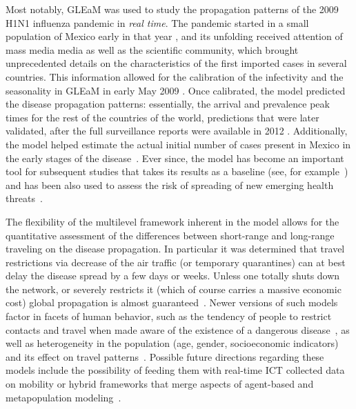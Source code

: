 Most notably, GLEaM was used to study the propagation patterns of the 2009 H1N1 influenza pandemic in \emph{real time}. The pandemic started in a small population of Mexico early in that year \cite{fraser_2009_pandemic}, and its unfolding received attention of mass media media as well as the scientific community, which brought unprecedented details on the characteristics of the first imported cases in several countries. This information allowed for the calibration of the infectivity and the seasonality in GLEaM in early May 2009 \cite{balcan_2009_seasonal}. Once calibrated, the model predicted the disease propagation patterns: essentially, the arrival and prevalence peak times for the rest of the countries of the world, predictions that were later validated, after the full surveillance reports were available in 2012 \cite{tizzoni_2012_real}. Additionally, the model helped estimate the actual initial number of cases present in Mexico in the early stages of the disease~\cite{colizza_2009_estimate}. Ever since, the model has become an important tool for subsequent studies that takes its results as a baseline (see, for example~\cite{brockmann_2013_hidden,lawyer_2016_measuring}) and has been also used to assess the risk of spreading of new emerging health threats~\cite{goncalves_2013_human,gomes_2014_assessing,poletto_2014_assessing}.

The flexibility of the multilevel framework inherent in the model allows for the quantitative assessment of the differences between short-range and long-range traveling on the disease propagation. In particular it was determined that travel restrictions via decrease of the air traffic (or temporary quarantines) can at best delay the disease spread by a few days or weeks. Unless one totally shuts down the network, or severely restricts it (which of course carries a massive economic cost) global propagation is almost guaranteed~\cite{bajardi_2011_human,poletto_2014_assessing}. Newer versions of such models factor in facets of human behavior, such as the tendency of people to restrict contacts and travel when made aware of the existence of a dangerous disease~\cite{meloni_2011_modeling}, as well as heterogeneity in the population (age, gender, socioeconomic indicators) and its effect on travel patterns~\cite{apolloni_2014_metapopulation}. Possible future directions regarding these models include the possibility of feeding them with real-time ICT collected data on mobility \cite{jia_2012_empirical,wesolowski_2014_quantifying,tizzoni_2014_use,lenormand_2015_human} or hybrid frameworks that merge aspects of agent-based and metapopulation modeling~\cite{ajelli_2010_comparing}. 

